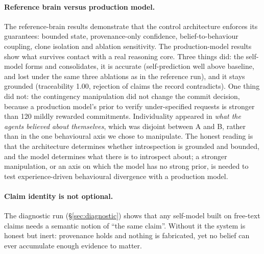 \documentclass[11pt]{article}
\begin{document}
\paragraph{Reference brain versus production model.} The reference-brain results demonstrate that the control architecture enforces its guarantees: bounded state, provenance-only confidence, belief-to-behaviour coupling, clone isolation and ablation sensitivity. The production-model results show what survives contact with a real reasoning core. Three things did: the self-model forms and consolidates, it is accurate (self-prediction well above baseline, and lost under the same three ablations as in the reference run), and it stays grounded (traceability 1.00, rejection of claims the record contradicts). One thing did not: the contingency manipulation did not change the commit decision, because a production model's prior to verify under-specified requests is stronger than 120 mildly rewarded commitments. Individuality appeared in \emph{what the agents believed about themselves}, which was disjoint between A and B, rather than in the one behavioural axis we chose to manipulate. The honest reading is that the architecture determines whether introspection is grounded and bounded, and the model determines what there is to introspect about; a stronger manipulation, or an axis on which the model has no strong prior, is needed to test experience-driven behavioural divergence with a production model.

\paragraph{Claim identity is not optional.} The diagnostic run (\S\ref{sec:diagnostic}) shows that any self-model built on free-text claims needs a semantic notion of ``the same claim''. Without it the system is honest but inert: provenance holds and nothing is fabricated, yet no belief can ever accumulate enough evidence to matter.
\end{document}

